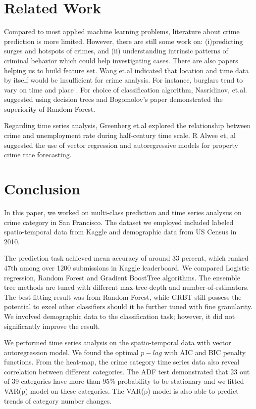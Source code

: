 \documentclass[11pt,conference]{IEEEtran}
\begin{document}
\section{Related Work}
Compared to most applied machine learning problems, literature about crime prediction is more limited. However, there are still some work on: (i)predicting surges and hotspots of crimes, and (ii) understanding intrinsic patterns of criminal behavior which could help investigating cases. There are also papers helping us to build feature set. Wang et.al indicated that location and time data by itself would be insufficient for crime analysis. For instance, burglars tend to vary on time and place \cite{6} . For choice of classification algorithm, Nasridinov, et.al. \cite{7} suggested using decision trees and Bogomolov's paper \cite{8} demonstrated the superiority of Random Forest. 

Regarding time series analysis, Greenberg et.al \cite{9} explored the relationship between crime and unemployment rate during half-century time scale. R Alwee et, al \cite{10} suggested the use of vector regression and autoregressive models for property crime rate forecasting.
\section{Conclusion}
In this paper, we worked on multi-class prediction and time series analysus on crime category in San Francisco. The dataset we employed included labeled spatio-temporal data from Kaggle and demographic data from US Census in 2010.

The prediction task achieved mean accuracy of around 33 percent, which ranked 47th among over 1200 submissions in Kaggle leaderboard. We compared Logistic regression, Random Forest and Gradient BoostTree algorithms. The ensemble tree methods are tuned with different max-tree-depth and number-of-estimators. The best fitting result was from Random Forest, while GRBT still possess the potential to excel other classifiers should it be further tuned with fine granularity. We involved demographic data to the classification task; however, it did not significantly improve the result.

We performed time series analysis on the spatio-temporal data with vector autoregression model. We found the optimal $p-lag$ with AIC and BIC penalty functions. From the heat-map, the crime category time series data also reveal correlation between different categories. The ADF test demonstrated that 23 out of 39 categories have more than 95\% probability to be stationary and we fitted VAR(p) model on these categories. The VAR(p) model is also able to predict trends of category number changes.
\end{document}
